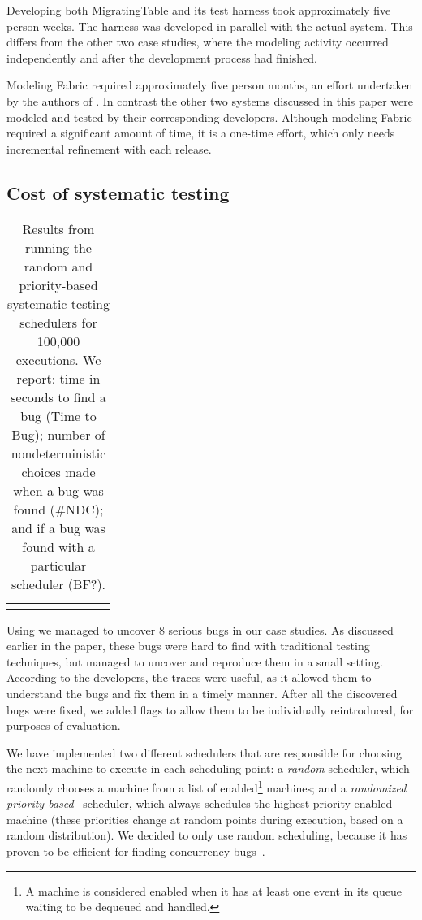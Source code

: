 Developing both MigratingTable and its \psharp test harness took approximately five person weeks. The harness was developed in parallel with the actual system. This differs from the other two case studies, where the modeling activity occurred independently and after the development process had finished.

Modeling Fabric required approximately five person months, an effort undertaken by the authors of \psharp. In contrast the other two systems discussed in this paper were modeled and tested by their corresponding developers. Although modeling Fabric required a significant amount of time, it is a one-time effort, which only needs incremental refinement with each release.

\subsection{Cost of systematic testing}
\label{sec:eval:machine_cost}

\setlength{\tabcolsep}{.68em}
\begin{table*}[t]
\small
\centering
\begin{tabular}{rl rrr rrr}
\centering

\end{tabular}
\caption{Results from running the \psharp random and priority-based systematic testing schedulers for 100,000 executions. We report: time in seconds to find a bug (Time to Bug); number of nondeterministic choices made when a bug was found (\#NDC); and if a bug was found with a particular scheduler (BF?).}
\label{tab:testing}
\end{table*}

Using \psharp we managed to uncover 8 serious bugs in our case studies. As discussed earlier in the paper, these bugs were hard to find with traditional testing techniques, but \psharp managed to uncover and reproduce them in a small setting. According to the developers, the \psharp traces were useful, as it allowed them to understand the bugs and fix them in a timely manner. After all the discovered bugs were fixed, we added flags to allow them to be individually reintroduced, for purposes of evaluation.

We have implemented two different schedulers that are responsible for choosing the next \psharp machine to execute in each scheduling point: a \emph{random} scheduler, which randomly chooses a machine from a list of enabled\footnote{A \psharp machine is considered enabled when it has at least one event in its queue waiting to be dequeued and handled.} machines; and a \emph{randomized priority-based}~\cite{burckhardt2010pct} scheduler, which always schedules the highest priority enabled machine (these priorities change at random points during execution, based on a random distribution). We decided to only use random scheduling, because it has proven to be efficient for finding concurrency bugs~\cite{thomson2014sct, deligiannis2015psharp}.

